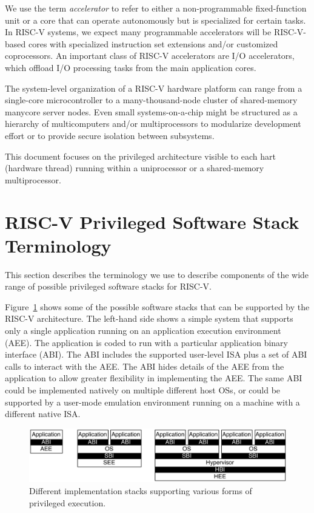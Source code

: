 We use the term {\em accelerator} to refer to either a
non-programmable fixed-function unit or a core that can operate
autonomously but is specialized for certain tasks.  In RISC-V systems,
we expect many programmable accelerators will be RISC-V-based cores
with specialized instruction set extensions and/or customized
coprocessors.  An important class of RISC-V accelerators are I/O
accelerators, which offload I/O processing tasks from the main
application cores.

The system-level organization of a RISC-V hardware platform can range
from a single-core microcontroller to a many-thousand-node cluster of
shared-memory manycore server nodes.  Even small systems-on-a-chip
might be structured as a hierarchy of multicomputers and/or
multiprocessors to modularize development effort or to provide secure
isolation between subsystems.

This document focuses on the privileged architecture visible to each
hart (hardware thread) running within a uniprocessor or a
shared-memory multiprocessor.

\section{RISC-V Privileged Software Stack Terminology}

This section describes the terminology we use to describe components
of the wide range of possible privileged software stacks for RISC-V.

Figure~\ref{fig:privimps} shows some of the possible software stacks
that can be supported by the RISC-V architecture.  The left-hand side
shows a simple system that supports only a single application running
on an application execution environment (AEE).  The application is
coded to run with a particular application binary interface (ABI).
The ABI includes the supported user-level ISA plus a set of ABI calls to
interact with the AEE.  The ABI hides details of the AEE from the
application to allow greater flexibility in implementing the AEE.  The
same ABI could be implemented natively on multiple different host OSs,
or could be supported by a user-mode emulation environment running on
a machine with a different native ISA.

\begin{figure}[th]
\centering
\includegraphics[width=\textwidth]{figs/privimps.pdf}
\caption{Different implementation stacks supporting various forms of
  privileged execution.}
\label{fig:privimps}
\end{figure}

